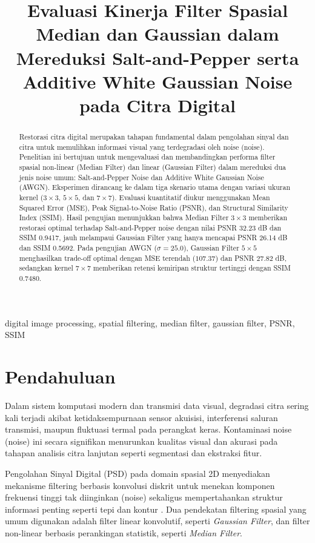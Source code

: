 \documentclass[conference,a4paper]{IEEEtran}
\title{\textbf{Evaluasi Kinerja Filter Spasial Median dan Gaussian dalam Mereduksi Salt-and-Pepper serta Additive White Gaussian Noise pada Citra Digital}}
\author{
	\IEEEauthorblockN{\textbf{M. Faridh Maulana}}
	\IEEEauthorblockA{
    	\textit{Program Studi Teknik Informatika} \\
    	\textit{Universitas Darussalam Gontor}\\
		mfaridhmaulana47@student.cs.unida.gontor.ac.id
	}
}
\begin{document}
\maketitle
\begin{abstract}
	Restorasi citra digital merupakan tahapan fundamental dalam pengolahan sinyal dan citra untuk memulihkan informasi visual yang terdegradasi oleh noise (noise). Penelitian ini bertujuan untuk mengevaluasi dan membandingkan performa filter spasial non-linear (Median Filter) dan linear (Gaussian Filter) dalam mereduksi dua jenis noise umum: Salt-and-Pepper Noise dan Additive White Gaussian Noise (AWGN). Eksperimen dirancang ke dalam tiga skenario utama dengan variasi ukuran kernel ($3\times3$, $5\times5$, dan $7\times7$). Evaluasi kuantitatif diukur menggunakan Mean Squared Error (MSE), Peak Signal-to-Noise Ratio (PSNR), dan Structural Similarity Index (SSIM). Hasil pengujian menunjukkan bahwa Median Filter $3\times3$ memberikan restorasi optimal terhadap Salt-and-Pepper noise dengan nilai PSNR 32.23 dB dan SSIM 0.9417, jauh melampaui Gaussian Filter yang hanya mencapai PSNR 26.14 dB dan SSIM 0.5692. Pada pengujian AWGN ($\sigma=25.0$), Gaussian Filter $5\times5$ menghasilkan trade-off optimal dengan MSE terendah ($107.37$) dan PSNR $27.82$ dB, sedangkan kernel $7\times7$ memberikan retensi kemiripan struktur tertinggi dengan SSIM $0.7480$.
\end{abstract}

\begin{IEEEkeywords}
	digital image processing, spatial filtering, median filter, gaussian filter, PSNR, SSIM
\end{IEEEkeywords}

\section{Pendahuluan}
Dalam sistem komputasi modern dan transmisi data visual, degradasi citra sering kali terjadi akibat ketidaksempurnaan sensor akuisisi, interferensi saluran transmisi, maupun fluktuasi termal pada perangkat keras. Kontaminasi noise (noise) ini secara signifikan menurunkan kualitas visual dan akurasi pada tahapan analisis citra lanjutan seperti segmentasi dan ekstraksi fitur.

Pengolahan Sinyal Digital (PSD) pada domain spasial 2D menyediakan mekanisme filtering berbasis konvolusi diskrit untuk menekan komponen frekuensi tinggi tak diinginkan (noise) sekaligus mempertahankan struktur informasi penting seperti tepi dan kontur \cite{oppenheim1999}. Dua pendekatan filtering spasial yang umum digunakan adalah filter linear konvolutif, seperti \textit{Gaussian Filter}, dan filter non-linear berbasis perankingan statistik, seperti \textit{Median Filter}.
\end{document}
